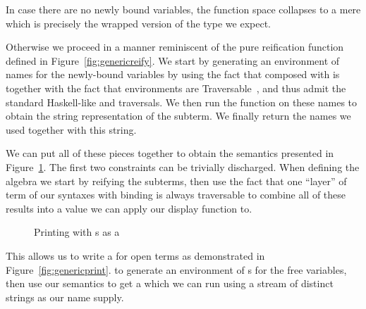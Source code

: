 \begin{agdasnippet}
\end{agdasnippet}

In case there are no newly bound variables, the  function space
collapses to a mere  which is precisely the wrapped version of
the type we expect.

\begin{agdasnippet}
\end{agdasnippet}

Otherwise we proceed in a manner reminiscent of the pure reification function
defined in Figure~\ref{fig:genericreify}. We start by generating an environment
of names for the newly-bound variables by using the fact that  composed
with  is  together with the fact that environments are
Traversable~\cite{mcbride_paterson_2008}, %
and thus admit the standard Haskell-like  and 
traversals. %
We then run the  function
on these names to obtain the string representation of the subterm. We finally
return the names we used together with this string.

\begin{agdasnippet}
\end{agdasnippet}

We can put all of these pieces together to obtain the  semantics
presented in Figure~\ref{fig:genericprinting}.
The first two constraints can be trivially discharged. When defining the
algebra we start by reifying the subterms, then use the fact that  one ``layer''
of term of our syntaxes with binding is always traversable to combine all of
these results into a value we can apply our display function to.

\begin{figure}[h]
\caption{Printing with s as a }\label{fig:genericprinting}
\end{figure}

This allows us to write a  for open terms as demonstrated in
Figure~\ref{fig:genericprint}.
to generate an environment of s for the free variables, then use
our semantics to get a  which we can run using a stream  of distinct
strings as our name supply.

